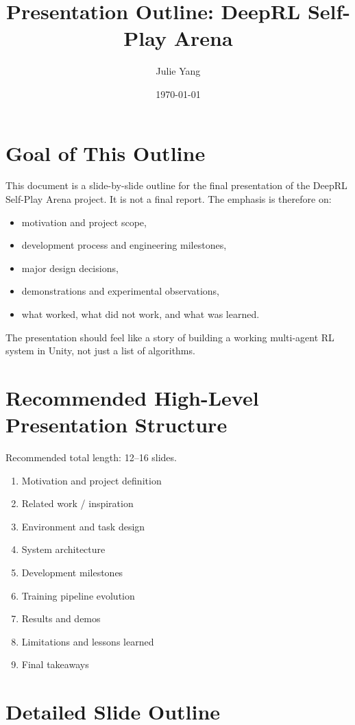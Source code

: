 \documentclass[11pt]{article}
\title{Presentation Outline: DeepRL Self-Play Arena}
\author{Julie Yang}
\date{\today}
\begin{document}
\maketitle

\section{Goal of This Outline}

This document is a slide-by-slide outline for the final presentation of the DeepRL Self-Play Arena project. It is not a final report. The emphasis is therefore on:

\begin{itemize}
    \item motivation and project scope,
    \item development process and engineering milestones,
    \item major design decisions,
    \item demonstrations and experimental observations,
    \item what worked, what did not work, and what was learned.
\end{itemize}

The presentation should feel like a story of building a working multi-agent RL system in Unity, not just a list of algorithms.

\section{Recommended High-Level Presentation Structure}

Recommended total length: 12--16 slides.

\begin{enumerate}
    \item Motivation and project definition
    \item Related work / inspiration
    \item Environment and task design
    \item System architecture
    \item Development milestones
    \item Training pipeline evolution
    \item Results and demos
    \item Limitations and lessons learned
    \item Final takeaways
\end{enumerate}

\section{Detailed Slide Outline}
\end{document}
